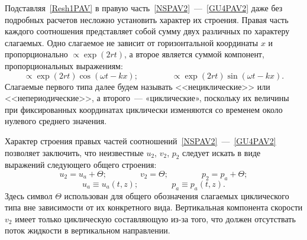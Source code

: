 Подставляя~\eqref{Resh1PAV} в правую часть~\eqref{NSPAV2}~---~\eqref{GU4PAV2} даже без подробных расчетов несложно установить характер их строения. Правая часть каждого соотношения представляет собой сумму двух различных по характеру слагаемых. Одно слагаемое не зависит от горизонтальной координаты $ x $ и пропорционально $ \propto \exp \left( 2 r t \right) $, а второе является суммой компонент, пропорциональных выражениям:
\begin{equation*}
\propto \exp \left( 2 r t \right) \cos \left( \omega t - k x \right); \qquad \qquad \propto \exp \left( 2 r t \right) \sin \left( \omega t - k x \right).
\end{equation*}
Слагаемые первого типа далее будем называть <<нециклические>> или <<непериодические>>, а второго~--- «циклические», поскольку их величины при фиксированных координатах циклически изменяются со временем около нулевого среднего значения. 

	Характер строения правых частей соотношений~\eqref{NSPAV2}~---~\eqref{GU4PAV2} позволяет заключить, что неизвестные $ u_{2} $, $ v_{2} $, $ p_{2} $ следует искать в виде выражений следующего общего строения:
	\begin{equation}
	u_{2}=u_{a}+\Theta; \qquad \qquad v_{2}=\Theta; \qquad \qquad p_{2}=p_{a}+\Theta;
\label{Resh2PAVVid}	
	\end{equation}
	\begin{equation*}
	u_{a} \equiv u_{a} \left( t, z \right); \qquad \qquad p_{a} \equiv p_{a} \left( t, z \right).
	\end{equation*}
Здесь символ $ \Theta $ использован для общего обозначения слагаемых циклического типа вне зависимости от их конкретного вида. Вертикальная компонента скорости $ v_{2} $ имеет только циклическую составляющую из-за того, что должен отсутствать поток жидкости в вертикальном направлении.

